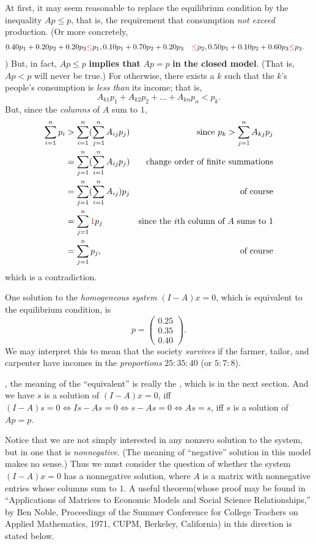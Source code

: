 At first, it may seem reasonable to replace the equilibrium condition by the inequality \(Ap \le p\), that is, the requirement that consumption \emph{not exceed} production.
(Or more concretely,
\begin{align*}
    0.40 p_1 + 0.20 p_2 + 0.20 p_3 & \RED{\le} p_1,
    0.10 p_1 + 0.70 p_2 + 0.20 p_3 & \RED{\le} p_2,
    0.50 p_1 + 0.10 p_2 + 0.60 p_3 & \RED{\le} p_3.
\end{align*}
)
But, in fact, \(Ap \le p\) \textbf{implies that} \(Ap = p\) \textbf{in the closed model}.
(That is, \(Ap < p\) will never be true.)
For otherwise, there exists a \(k\) such that the \(k\)'s people's consumption is \emph{less than} its income;
that is,
\[
    A_{k1} p_{1} + A_{k2} p_{2} + ... + A_{kn} p_n < p_k.
\]
But, since the \emph{columns} of \(A\) sum to \(1\),
\begin{align*}
    \sum_{i = 1}^n p_i & > \sum_{i = 1}^n (\sum_{j = 1}^n A_{ij} p_j) & \text{since \(p_k > \sum_{j = 1}^n A_{kj} p_j\)}\\
                       & = \sum_{j = 1}^n (\sum_{i = 1}^n A_{ij} p_j) & \text{change order of finite summations} \\
                       & = \sum_{j = 1}^n (\sum_{i = 1}^n A_{ij}) p_j & \text{of course} \\
                       & = \sum_{j = 1}^n \RED{1} p_j & \text{since the \(i\)th column of \(A\) sums to \(1\)} \\
                       & = \sum_{j = 1}^n p_j, & \text{of course}
\end{align*}
which is a contradiction.

One solution to the \emph{homogeneous system} \((I - A)x = 0\), which is equivalent\RED{*} to the equilibrium condition, is
\[
    p = \begin{pmatrix} 0.25 \\ 0.35 \\ 0.40 \end{pmatrix}.
\]
We may interpret this to mean that the society \emph{survives} if the farmer, tailor, and carpenter have incomes in the \emph{proportions} \(25 : 35 : 40\) (or \(5 : 7 : 8\)).
\begin{note}
\RED{*}, the meaning of the ``equivalent'' is really the , which is in the next section.
And we have \(s\) is a solution of \((I - A)x = 0\), iff \((I - A)s = 0 \iff Is - As = 0 \iff s - As = 0 \iff As = s\), iff \(s\) is a solution of \(Ap = p\).
\end{note}
Notice that we are not simply interested in any nonzero solution to the system, but in one that is \emph{nonnegative}.
(The meaning of ``negative'' solution in this model makes no sense.)
Thus we must consider the question of whether the system \((I - A)x = 0\) has a nonnegative solution, where \(A\) is a matrix with nonnegative entries whose columns sum to \(1\).
A useful theorem(whose proof may be found in ``Applications of Matrices to Economic Models and Social Science Relationships,'' by Ben Noble, Proceedings of the Summer Conference for College Teachers on Applied Mathematics, 1971, CUPM, Berkeley, California) in this direction is stated below.

